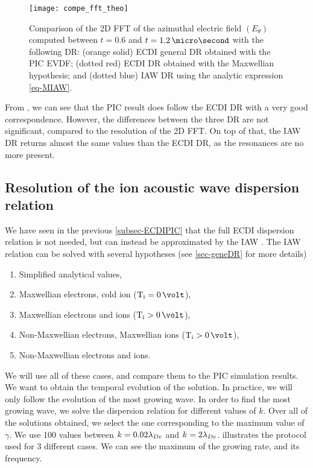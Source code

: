     \begin{figure}[!hbt]
      \centering
      \texttt{[image: compe\_fft\_theo]}
      \caption{Comparison of the \acs{2D} \acs{FFT} of the azimuthal electric field $(E_{\theta})$ computed between  $t=0.6$ and $t=1.2\,\micro\second$ with the following \acs{DR}\string: (orange solid) \acs{ECDI} general \acs{DR} obtained with the \acs{PIC} \acs{EVDF}; (dotted red) \acs{ECDI} \acs{DR} obtained with the Maxwellian hypothesis; and (dotted blue) \acs{IAW} \acs{DR} using the analytic expression \cref{eq-MIAW}.   }
      \label{fig-DR_and_fft}
    \end{figure}
    
    From , we can see that the \ac{PIC} result does follow the \ac{ECDI} \ac{DR} with a very good correspondence.
    However, the differences between the three \ac{DR} are not significant, compared to the resolution of the \ac{2D} \ac{FFT}.
    On top of that, the \ac{IAW} \ac{DR} returns almost the same values than the \ac{ECDI} \ac{DR}, as the resonances are no more present.
    
  \FloatBarrier
  \subsection{Resolution of the ion acoustic wave dispersion relation} \label{subsec-VDFIAW}
  
  We have seen in the previous \cref{subsec-ECDIPIC} that the full \ac{ECDI} dispersion relation is not needed, but can instead be approximated by the \ac{IAW} \citep{lafleur2018,janhunen2018,taccogna2019}.
  The \ac{IAW} relation can be solved with several hypotheses (see \cref{sec-geneDR} for more details)
  \begin{enumerate}
    \item Simplified analytical values,
    \item Maxwellian electrons, cold ion ($\Ti = 0\,\volt$),
    \item Maxwellian electrons and ions ($\Ti > 0\,\volt$),
    \item Non-Maxwellian electrons, Maxwellian ions ($\Ti > 0\,\volt$),
    \item Non-Maxwellian electrons and ions.
  \end{enumerate}
  
  We will use all of these cases, and compare them to the \ac{PIC} simulation results.
  We want to obtain the temporal evolution of the solution.
  In practice, we will only follow the evolution of the most growing wave.
  In order to find the most growing wave, we solve the dispersion relation for different values of $k$.
  Over all of the solutions obtained, we select the one corresponding to the maximum value of $\gamma$.
  We use 100 values between $k=0.02 \lambda_{De}$ and $k = 2 \lambda_{De}$.
   illustrates the protocol used for 3 different cases.
  We can see the maximum of the growing rate, and its frequency.
  
